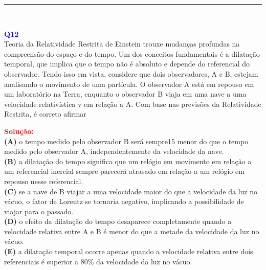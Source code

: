 \documentclass[a4paper,12pt]{article}
\begin{document}
\noindent\rule{\linewidth}{0.4pt}\\
\begin{flushleft}
\textbf{\textcolor{blue}{\Large Q12}}\\
Teoria da Relatividade Restrita de Einstein
trouxe mudanças profundas na compreensão do
espaço e do tempo. Um dos conceitos
fundamentais é a dilatação temporal, que implica
que o tempo não é absoluto e depende do
referencial do observador.
Tendo isso em vista, considere que dois
observadores, A e B, estejam analisando o
movimento de uma partícula. O observador A está
em repouso em um laboratório na Terra, enquanto
o observador B viaja em uma nave a uma
velocidade relativística v em relação a A. Com
base nas previsões da Relatividade Restrita, é
correto afirmar 

\textcolor{red}{\textbf{Solução:}}\\

\textbf{(A)} o tempo medido pelo observador B será sempre15
menor do que o tempo medido pelo observador
A, independentemente da velocidade da nave.\\
\colorbox{green!50}{\textbf{(B)}} a dilatação do tempo significa que um relógio em
movimento em relação a um referencial inercial
sempre parecerá atrasado em relação a um
relógio em repouso nesse referencial.\\
\textbf{(C)} se a nave de B viajar a uma velocidade maior do
que a velocidade da luz no vácuo, o fator de
Lorentz se tornaria negativo, implicando a
possibilidade de viajar para o passado.\\
\textbf{(D)} o efeito da dilatação do tempo desaparece
completamente quando a velocidade relativa
entre A e B é menor do que a metade da
velocidade da luz no vácuo.\\
\textbf{(E)} a dilatação temporal ocorre apenas quando a
velocidade relativa entre dois referenciais é
superior a 80\% da velocidade da luz no vácuo.

\end{flushleft}
\end{document}
